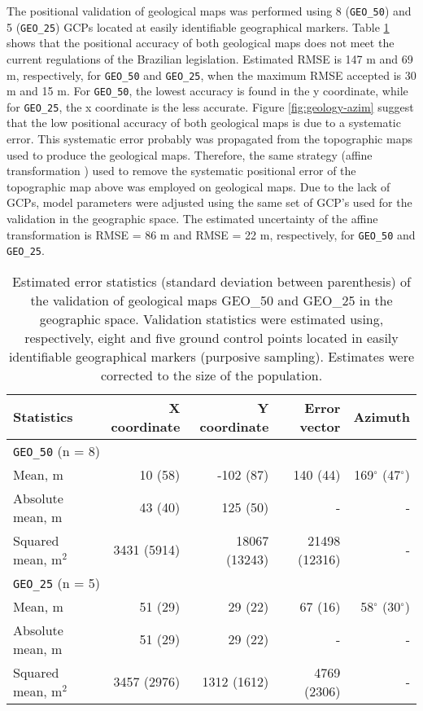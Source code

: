 The positional validation of geological maps was performed using 8 (\texttt{GEO\_50}) and 5 (\texttt{GEO\_25}) GCPs located at easily identifiable geographical markers. Table \ref{tab:geology-geo-val} shows that the positional accuracy of both geological maps does not meet the current regulations of the Brazilian legislation. Estimated RMSE is 147 m and 69 m, respectively, for \texttt{GEO\_50} and \texttt{GEO\_25}, when the maximum RMSE accepted is 30 m and 15 m. For \texttt{GEO\_50}, the lowest accuracy is found in the y coordinate, while for \texttt{GEO\_25}, the x coordinate is the less accurate. Figure \ref{fig:geology-azim} suggest that the low positional accuracy  of both geological maps is due to a systematic error. This systematic error probably was propagated from the topographic maps used to produce the geological maps. Therefore, the same strategy (affine transformation ) used to remove the systematic positional error of the topographic map above was employed on geological maps. Due to the lack of GCPs, model parameters were adjusted using the same set of GCP's used for the validation in the geographic space. The estimated uncertainty of the affine transformation is RMSE = 86 m and RMSE = 22 m, respectively, for \texttt{GEO\_50} and \texttt{GEO\_25}.

\begin{table}[ht]
  \caption{Estimated error statistics (standard deviation between parenthesis) of the validation of geological maps GEO\_50 and GEO\_25 in the geographic space. Validation statistics were estimated using, respectively, eight and five ground control points located in easily identifiable geographical markers (purposive sampling). Estimates were corrected to the size of the population.}
  \label{tab:geology-geo-val}
  \centering
  {\small
  \begin{tabular}{lrrrr}
    \hline
    Statistics           & X coordinate & Y coordinate  & Error vector  & Azimuth                  \\
    \hline
    \multicolumn{5}{l}{\texttt{GEO\_50} (n = 8)}                                                   \\
    \hline
    Mean, m              & 10   (58)    & -102  (87)    & 140   (44)    & 169$^\circ$ (47$^\circ$) \\ 
    Absolute mean, m     & 43   (40)    & 125   (50)    & -             & -                        \\ 
    Squared mean, m$^2$  & 3431 (5914)  & 18067 (13243) & 21498 (12316) & -                        \\
    \hline
    \multicolumn{5}{l}{\texttt{GEO\_25} (n = 5)}                                                   \\
    \hline
    Mean, m              & 51    (29)   & 29    (22)    & 67    (16)    & 58$^\circ$  (30$^\circ$) \\ 
    Absolute mean, m     & 51    (29)   & 29    (22)    & -             & -                        \\ 
    Squared mean, m$^2$  & 3457  (2976) & 1312  (1612)  & 4769  (2306)  & -                        \\
    \hline
  \end{tabular}}
\end{table}

